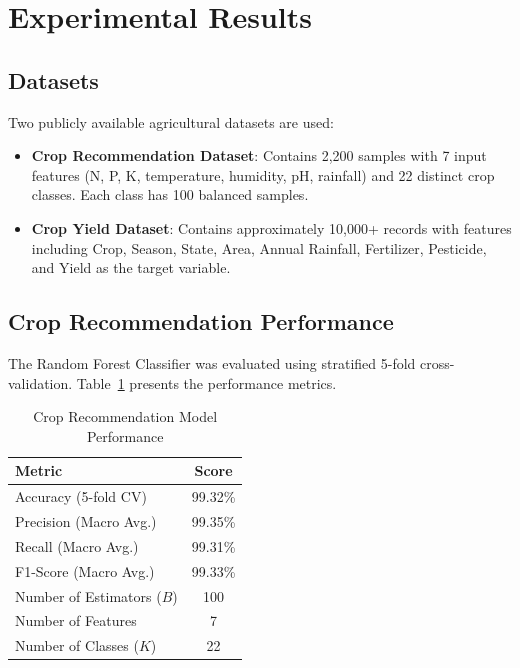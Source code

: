 
\section{Experimental Results}
\label{sec:results}

\subsection{Datasets}
Two publicly available agricultural datasets are used:

\begin{itemize}
    \item \textbf{Crop Recommendation Dataset}: Contains 2,200 samples with 7 input features (N, P, K, temperature, humidity, pH, rainfall) and 22 distinct crop classes. Each class has 100 balanced samples.
    \item \textbf{Crop Yield Dataset}: Contains approximately 10,000+ records with features including Crop, Season, State, Area, Annual Rainfall, Fertilizer, Pesticide, and Yield as the target variable.
\end{itemize}

\subsection{Crop Recommendation Performance}
The Random Forest Classifier was evaluated using stratified 5-fold cross-validation. Table~\ref{tab:classification_results} presents the performance metrics.

\begin{table}[htbp]
\caption{Crop Recommendation Model Performance}
\label{tab:classification_results}
\centering
\begin{tabular}{@{}lc@{}}
\toprule
\textbf{Metric} & \textbf{Score} \\
\midrule
Accuracy (5-fold CV) & 99.32\% \\
Precision (Macro Avg.) & 99.35\% \\
Recall (Macro Avg.) & 99.31\% \\
F1-Score (Macro Avg.) & 99.33\% \\
Number of Estimators ($B$) & 100 \\
Number of Features & 7 \\
Number of Classes ($K$) & 22 \\
\bottomrule
\end{tabular}
\end{table}

